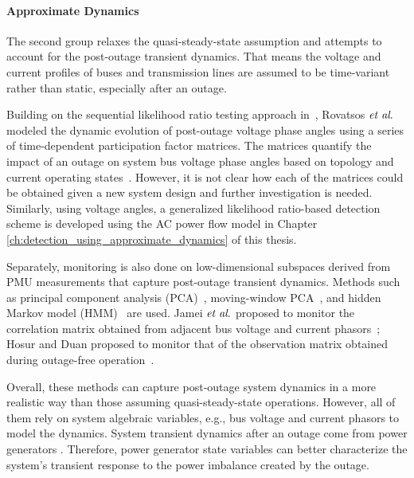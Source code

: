 \paragraph{Approximate Dynamics}
The second group relaxes the quasi-steady-state assumption and attempts to account for the post-outage transient dynamics. That means the voltage and current profiles of buses and transmission lines are assumed to be time-variant rather than static, especially after an outage. 

Building on the sequential likelihood ratio testing approach in~\cite{Chen2016}, Rovatsos $\textit{et al}.$ modeled the dynamic evolution of post-outage voltage phase angles using a series of time-dependent participation factor matrices. The matrices quantify the impact of an outage on system bus voltage phase angles based on topology and current operating states~\cite{Rovatsos2017}. However, it is not clear how each of the matrices could be obtained given a new system design and further investigation is needed. Similarly, using voltage angles, a generalized likelihood ratio-based detection scheme is developed using the AC power flow model in Chapter \ref{ch:detection_using_approximate_dynamics} of this thesis. 

Separately, monitoring is also done on low-dimensional subspaces derived from PMU measurements that capture post-outage transient dynamics. Methods such as principal component analysis (PCA)~\cite{Xie2014}, moving-window PCA~\cite{Rafferty2016}, and hidden Markov model (HMM)~\cite{Huang2016b} are used. Jamei $\textit{et al}.$ proposed to monitor the correlation matrix obtained from adjacent bus voltage and current phasors~\cite{Jamei2017a}; Hosur and Duan proposed to monitor that of the observation matrix obtained during outage-free operation~\cite{Hosur2019}. 

Overall, these methods can capture post-outage system dynamics in a more realistic way than those assuming quasi-steady-state operations. However, all of them rely on system algebraic variables, e.g., bus voltage and current phasors to model the dynamics. System transient dynamics after an outage come from power generators \cite{Glover2012}. Therefore, power generator state variables can better characterize the system's transient response to the power imbalance created by the outage.

